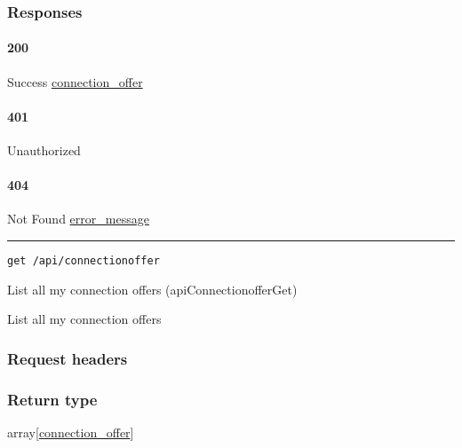 \hypertarget{responses-20}{%
\subsubsection{Responses}\label{responses-20}}

\hypertarget{section-66}{%
\paragraph{200}\label{section-66}}

Success \protect\hyperlink{connection_offer}{connection\_offer}

\hypertarget{section-67}{%
\paragraph{401}\label{section-67}}

Unauthorized \protect\hyperlink{}{}

\hypertarget{section-68}{%
\paragraph{404}\label{section-68}}

Not Found \protect\hyperlink{error_message}{error\_message}

\begin{center}\rule{0.5\linewidth}{\linethickness}\end{center}

\protect\hypertarget{apiConnectionofferGet}{}{}

\begin{verbatim}
get /api/connectionoffer
\end{verbatim}

List all my connection offers ({apiConnectionofferGet})

List all my connection offers

\hypertarget{request-headers-8}{%
\subsubsection{Request headers}\label{request-headers-8}}

\hypertarget{return-type-16}{%
\subsubsection{Return type}\label{return-type-16}}

array{[}\protect\hyperlink{connection_offer}{connection\_offer}{]}

